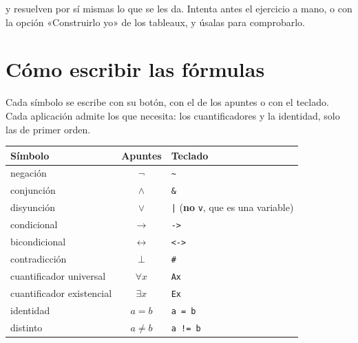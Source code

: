 \documentclass[a4paper,spanish,11pt]{article}
\newcommand{\tecla}[1]{\texttt{#1}}
\begin{document}
\noindent \apptablas{} y \apptableaux{} resuelven por sí mismas lo que se les da. Intenta antes el ejercicio a mano, o con la opción «Construirlo yo» de los tableaux, y úsalas para comprobarlo.

\section{Cómo escribir las fórmulas}

Cada símbolo se escribe con su botón, con el de los apuntes o con el teclado. Cada aplicación admite los que necesita: los cuantificadores y la identidad, solo las de primer orden.

\begin{center}
\begin{tabular}{lcl}
\hline
\textbf{Símbolo} & \textbf{Apuntes} & \textbf{Teclado} \\
\hline
negación & $\neg$ & \tecla{\textasciitilde} \\
conjunción & $\land$ & \tecla{\&} \\
disyunción & $\lor$ & \tecla{|} \quad (\textbf{no} \tecla{v}, que es una variable) \\
condicional & $\to$ & \tecla{->} \\
bicondicional & $\leftrightarrow$ & \tecla{<->} \\
contradicción & $\bot$ & \tecla{\#} \\
cuantificador universal & $\forall x$ & \tecla{Ax} \\
cuantificador existencial & $\exists x$ & \tecla{Ex} \\
identidad & $a = b$ & \tecla{a = b} \\
distinto & $a \neq b$ & \tecla{a != b} \\
\hline
\end{tabular}
\end{center}
\end{document}
